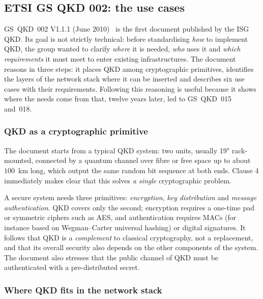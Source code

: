 \subsection{ETSI GS QKD 002: the use cases}
\label{sec:qkd002}

GS~QKD~002 V1.1.1 (June 2010)~\cite{qkd002} is the first document published
by the ISG QKD. Its goal is not strictly technical: before standardising
\emph{how} to implement QKD, the group wanted to clarify \emph{where} it is
needed, \emph{who} uses it and \emph{which requirements} it must meet to
enter existing infrastructures. The document reasons in three steps: it
places QKD among cryptographic primitives, identifies the layers of the
network stack where it can be inserted and describes six use cases with
their requirements. Following this reasoning is useful because it shows
where the needs come from that, twelve years later, led to GS~QKD~015
and~018.

\subsubsection{QKD as a cryptographic primitive}

The document starts from a typical QKD system: two units, usually 19"
rack-mounted, connected by a quantum channel over fibre or free space up to
about $100$~km long, which output the same random bit sequence at both
ends. Clause 4 immediately makes clear that this solves \emph{a single}
cryptographic problem.

A secure system needs three primitives: \emph{encryption}, \emph{key
distribution} and \emph{message authentication}. QKD covers only the
second; encryption requires a one-time pad or symmetric ciphers such as
AES, and authentication requires MACs (for instance based on Wegman–Carter
universal hashing) or digital signatures. It follows that QKD is a
\emph{complement} to classical cryptography, not a replacement, and that
its overall security also depends on the other components of the system.
The document also stresses that the public channel of QKD must be
authenticated with a pre-distributed secret.

\subsubsection{Where QKD fits in the network stack}

